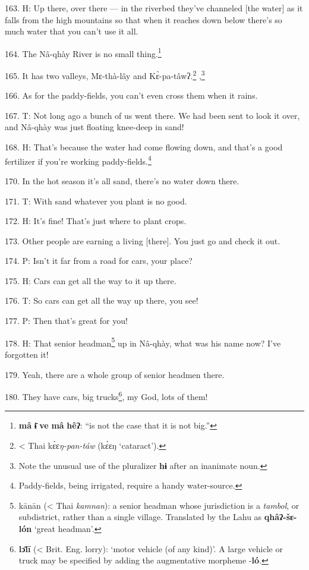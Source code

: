 163. H: Up there, over there --- in the riverbed they've channeled [the water]
as it falls from the high mountains so that when it reaches down below there's
so much water that you can't use it all.

164. The Nâ-qhày River is no small thing.\footnote{\textbf{mâ} \textbf{ɨ̄} \textbf{ve} \textbf{mâ} \textbf{hêʔ}: ``is not the case that it is not big.''}

165. It has two valleys, Mɛ-thà-lây and Kɛ̀-pa-tâwʔ.\footnote{< Thai kɛ̀ɛ\textit{ŋ-pan-táw} (kɛ̀ɛŋ `cataract').} ,\footnote{Note the unusual use of the pluralizer \textbf{hɨ} after an inanimate noun.}

166. As for the paddy-fields, you can't even cross them when it rains.

167. T: Not long ago a bunch of us went there. We had been sent to look it over,
and Nâ-qhày was just floating knee-deep in sand!

168. H: That's because the water had come flowing down, and that's a good fertilizer
if you're working paddy-fields.\footnote{Paddy-fields, being irrigated, require a handy water-source.}

170. In the hot season it's all sand, there's no water down there.

171. T: With sand whatever you plant is no good.

172. H: It's fine! That's just where to plant crops.

173. Other people are earning a living [there]. You just go and check it out.

174. P: Isn't it far from a road for cars, your place?

175. H: Cars can get all the way to it up there.

176. T: So cars can get all the way up there, you see!

177. P: Then that's great for you!

178. H: That senior headman\footnote{kānān (< Thai \textit{kamnan}): a senior headman whose jurisdiction is a \textit{tambol}, or subdistrict, rather than a single village. Translated by the Lahu as \textbf{qhâʔ-šɛ-lón} `great headman'.} up in Nâ-qhày, what was his name now? I've forgotten
it!

179. Yeah, there are a whole group of senior headmen there.

180. They have cars, big trucks\footnote{\textbf{lɔ̄lī} (< Brit. Eng. lorry): `motor vehicle (of any kind)'. A large vehicle or truck may be specified by adding the augmentative morpheme -\textbf{ló}.}, my God, lots of them!

